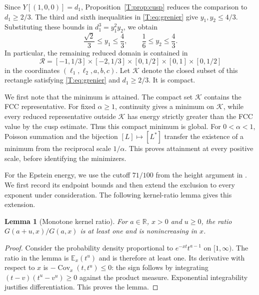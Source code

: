 \documentclass[reqno,english]{amsart}
\newtheorem{lemma}[theorem]{Lemma}
\theoremstyle{definition}
\newtheorem{open problem}[theorem]{Open Problem}
\theoremstyle{remark}
\theoremstyle{plain}
\newcommand{\R}{{\mathbb R}}
\numberwithin{equation}{section}
\newcommand{\calK}{\mathcal K}
\begin{document}
Since $Y[(1,0,0)]=d_1$, Proposition~\ref{T:prop:cusp} reduces the
comparison to $d_1\ge2/3$. The third and sixth inequalities in
\eqref{T:eq:grenier} give $y_1,y_2\le4/3$. Substituting these bounds
in $d_1^3=y_1^2y_2$, we obtain
\begin{equation}\label{T:eq:ycompact}
 \frac{\sqrt2}{3}\le y_1\le\frac43,
 \qquad \frac16\le y_2\le\frac43.
\end{equation}
In particular, the remaining reduced domain is contained in
\begin{equation}\label{T:eq:rootmath}
 \mathcal R=[-1,1/3]\times[-2,1/3]\times[0,1/2]\times[0,1]\times[0,1/2]
\end{equation}
in the coordinates $(\ell_1,\ell_2,a,b,c)$. Let $\calK$ denote the closed subset of this rectangle satisfying \eqref{T:eq:grenier} and $d_1\ge2/3$. It is compact.

We first note that the minimum is attained. The compact set $\calK$
contains the FCC representative. For fixed $\alpha\ge1$, continuity
gives a minimum on $\calK$, while every reduced representative outside
$\calK$ has energy strictly greater than the FCC value by the cusp
estimate. Thus this compact minimum is global. For $0<\alpha<1$,
Poisson summation and the bijection $[L]\mapsto[L^*]$ transfer the
existence of a minimum from the reciprocal scale $1/\alpha$.
This proves attainment at every positive scale, before identifying
the minimizers.

For the Epstein energy, we use the cutoff $71/100$ from the height
argument in \cite[Section~4, pp.~15--16]{SS}. We first record its
endpoint bounds and then extend the exclusion to every exponent under
consideration. The following kernel-ratio lemma gives this extension.

\begin{lemma}[Monotone kernel ratio]\label{E:lem:ratio}
For $a\in\R$, $x>0$ and $u\ge0$, the ratio $G(a+u,x)/G(a,x)$ is at least one and is nonincreasing in $x$.
\end{lemma}
\begin{proof}
Consider the probability density proportional to $e^{-xt}t^{a-1}$ on
$[1,\infty)$. The ratio in the lemma is $\mathbb E_x(t^u)$ and is
therefore at least one. Its derivative with respect to $x$ is
$-\operatorname{Cov}_x(t,t^u)\le0$: the sign follows by integrating
$(t-v)(t^u-v^u)\ge0$ against the product measure. Exponential
integrability justifies differentiation. This proves the lemma.
\end{proof}
\end{document}
